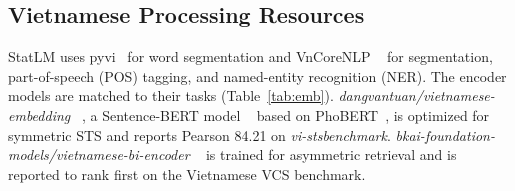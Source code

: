 \subsection{Vietnamese Processing Resources}
StatLM uses pyvi~\cite{pyvi} for word segmentation and VnCoreNLP
~\cite{vu2018vncorenlp} for segmentation, part-of-speech (POS) tagging, and
named-entity recognition (NER). The encoder models are matched to their tasks
(Table~\ref{tab:emb}). \emph{dangvantuan/vietnamese-embedding}
~\cite{dangvantuan2021vietnamese}, a Sentence-BERT model
~\cite{reimers2019sentence} based on PhoBERT~\cite{nguyen2020phobert}, is optimized
for symmetric STS and reports Pearson 84.21 on \emph{vi-stsbenchmark}.
\emph{bkai-foundation-models/vietnamese-bi-encoder}
~\cite{nguyen2025improving} is trained for asymmetric retrieval and is reported to
rank first on the Vietnamese VCS benchmark.

